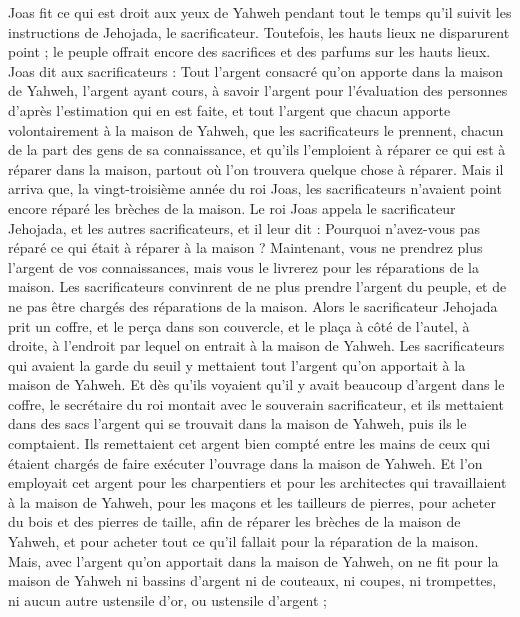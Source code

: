 \begin{multicols}{2}
Joas fit ce qui est droit aux yeux de Yahweh pendant tout le temps qu’il suivit les instructions de Jehojada, le sacrificateur.
Toutefois, les hauts lieux ne disparurent point ; le peuple offrait encore des sacrifices et des parfums sur les hauts lieux.
Joas dit aux sacrificateurs : Tout l’argent consacré qu’on apporte dans la maison de Yahweh, l’argent ayant cours, à savoir l’argent pour l’évaluation des personnes d’après l’estimation qui en est faite, et tout l’argent que chacun apporte volontairement à la maison de Yahweh,
que les sacrificateurs le prennent, chacun de la part des gens de sa connaissance, et qu’ils l’emploient à réparer ce qui est à réparer dans la maison, partout où l’on trouvera quelque chose à réparer.
Mais il arriva que, la vingt-troisième année du roi Joas, les sacrificateurs n’avaient point encore réparé les brèches de la maison.
Le roi Joas appela le sacrificateur Jehojada, et les autres sacrificateurs, et il leur dit : Pourquoi n’avez-vous pas réparé ce qui était à réparer à la maison ? Maintenant, vous ne prendrez plus l’argent de vos connaissances, mais vous le livrerez pour les réparations de la maison.
Les sacrificateurs convinrent de ne plus prendre l’argent du peuple, et de ne pas être chargés des réparations de la maison.
Alors le sacrificateur Jehojada prit un coffre, et le perça dans son couvercle, et le plaça à côté de l’autel, à droite, à l’endroit par lequel on entrait à la maison de Yahweh. Les sacrificateurs qui avaient la garde du seuil y mettaient tout l’argent qu’on apportait à la maison de Yahweh.
Et dès qu’ils voyaient qu’il y avait beaucoup d’argent dans le coffre, le secrétaire du roi montait avec le souverain sacrificateur, et ils mettaient dans des sacs l’argent qui se trouvait dans la maison de Yahweh, puis ils le comptaient.
Ils remettaient cet argent bien compté entre les mains de ceux qui étaient chargés de faire exécuter l’ouvrage dans la maison de Yahweh. Et l’on employait cet argent pour les charpentiers et pour les architectes qui travaillaient à la maison de Yahweh,
pour les maçons et les tailleurs de pierres, pour acheter du bois et des pierres de taille, afin de réparer les brèches de la maison de Yahweh, et pour acheter tout ce qu’il fallait pour la réparation de la maison.
Mais, avec l’argent qu’on apportait dans la maison de Yahweh, on ne fit pour la maison de Yahweh ni bassins d’argent ni de couteaux, ni coupes, ni trompettes, ni aucun autre ustensile d’or, ou ustensile d’argent ;

\end{multicols}
